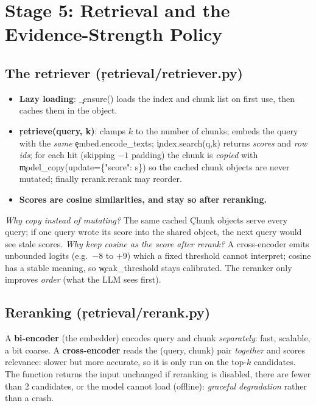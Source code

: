 \chapter{Stage 5: Retrieval and the Evidence-Strength Policy}
\section{The retriever (\c{retrieval/retriever.py})}
\begin{itemize}
 \item \textbf{Lazy loading}: \c{\_ensure()} loads the index and chunk list on first use, then caches them in the object.
 \item \textbf{\c{retrieve(query, k)}}: clamps $k$ to the number of chunks; embeds the query with the \emph{same} \c{embed.encode\_texts}; \c{index.search(q,k)} returns \emph{scores} and \emph{row ids}; for each hit (skipping $-1$ padding) the chunk is \emph{copied} with \c{model\_copy(update=\{"score": s\})} so the cached chunk objects are never mutated; finally \c{rerank.rerank} may reorder.
 \item \textbf{Scores are cosine similarities, and stay so after reranking.}
\end{itemize}
\begin{why}
\emph{Why copy instead of mutating?} The same cached \c{Chunk} objects serve every query; if one query wrote its score into the shared object, the next query would see stale scores. \emph{Why keep cosine as the score after rerank?} A cross-encoder emits unbounded logits (e.g.\ $-8$ to $+9$) which a fixed threshold cannot interpret; cosine has a stable meaning, so \c{weak\_threshold} stays calibrated. The reranker only improves \emph{order} (what the LLM sees first).
\end{why}

\section{Reranking (\c{retrieval/rerank.py})}
A \textbf{bi-encoder} (the embedder) encodes query and chunk \emph{separately}: fast, scalable, a bit coarse. A \textbf{cross-encoder} reads the (query, chunk) pair \emph{together} and scores relevance: slower but more accurate, so it is only run on the top-$k$ candidates. The function returns the input unchanged if reranking is disabled, there are fewer than 2 candidates, or the model cannot load (offline): \emph{graceful degradation} rather than a crash.

